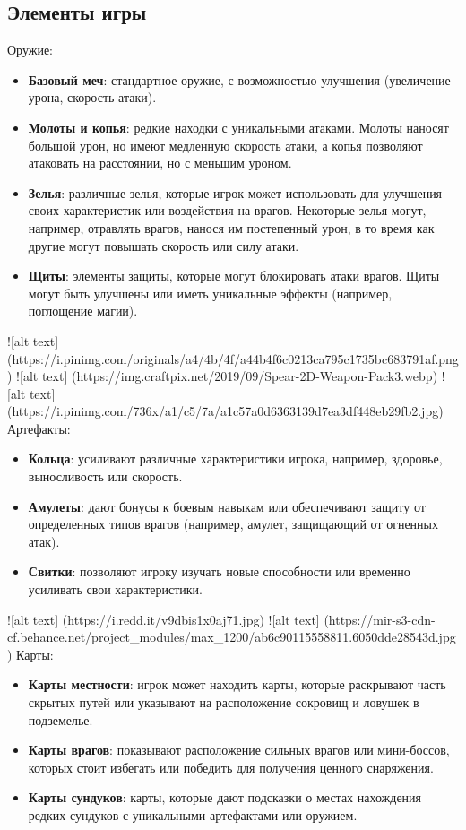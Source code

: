 \documentclass{article}
\begin{document}
\subsection{Элементы игры}
Оружие:
\begin{itemize}
    \item \textbf{Базовый меч}: стандартное оружие, с возможностью улучшения (увеличение урона, скорость атаки).
    \item \textbf{Молоты и копья}: редкие находки с уникальными атаками. Молоты наносят большой урон, но имеют медленную скорость атаки, а копья позволяют атаковать на расстоянии, но с меньшим уроном.
    \item \textbf{Зелья}: различные зелья, которые игрок может использовать для улучшения своих характеристик или воздействия на врагов. Некоторые зелья могут, например, отравлять врагов, нанося им постепенный урон, в то время как другие могут повышать скорость или силу атаки.
    \item \textbf{Щиты}: элементы защиты, которые могут блокировать атаки врагов. Щиты могут быть улучшены или иметь уникальные эффекты (например, поглощение магии).
\end{itemize}
![alt text](https://i.pinimg.com/originals/a4/4b/4f/a44b4f6c0213ca795c1735bc683791af.png)
![alt text] (https://img.craftpix.net/2019/09/Spear-2D-Weapon-Pack3.webp)
![alt text] (https://i.pinimg.com/736x/a1/c5/7a/a1c57a0d6363139d7ea3df448eb29fb2.jpg)
Артефакты:
\begin{itemize}
    \item \textbf{Кольца}: усиливают различные характеристики игрока, например, здоровье, выносливость или скорость.
    \item \textbf{Амулеты}: дают бонусы к боевым навыкам или обеспечивают защиту от определенных типов врагов (например, амулет, защищающий от огненных атак).
    \item \textbf{Свитки}: позволяют игроку изучать новые способности или временно усиливать свои характеристики.
\end{itemize}
![alt text] (https://i.redd.it/v9dbis1x0aj71.jpg)
![alt text] (https://mir-s3-cdn-cf.behance.net/project_modules/max_1200/ab6c90115558811.6050dde28543d.jpg)
Карты:
\begin{itemize}
    \item \textbf{Карты местности}: игрок может находить карты, которые раскрывают часть скрытых путей или указывают на расположение сокровищ и ловушек в подземелье.
    \item \textbf{Карты врагов}: показывают расположение сильных врагов или мини-боссов, которых стоит избегать или победить для получения ценного снаряжения.
    \item \textbf{Карты сундуков}: карты, которые дают подсказки о местах нахождения редких сундуков с уникальными артефактами или оружием.
\end{itemize}
\end{document}
